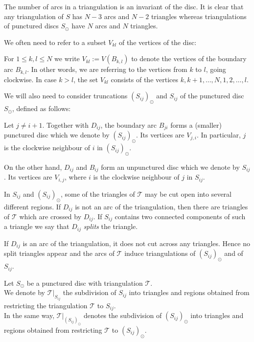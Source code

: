 \documentclass[a4paper]{amsart}
\begin{document}
The number of arcs in a triangulation is an invariant of the disc.
It is clear that any triangulation of $S$ has $N-3$ arcs and $N-2$
triangles
whereas triangulations of punctured discs $S_{\odot}$ have $N$ arcs
and $N$ triangles.

We often need to refer to a subset $V_{kl}$ of the vertices of the
disc:
\begin{definition}
For $1\le k,l\le N$ we write $V_{kl}:=V(B_{k,l})$
to denote the vertices of the
boundary arc $B_{k,l}$. In other words, we are referring to the
vertices
from $k$ to $l$, going clockwise. In case $k>l$, the set $V_{kl}$
consists of the
vertices $k,k+1,\dots,N,1,2,\dots,l$.
\end{definition}

We will also need to consider truncations
$(S_{ij})_{\odot}$ and $S_{ij}$ of the punctured disc
$S_{\odot}$, defined as follows:
\begin{definition}\label{def:truncation}
Let $j\neq i+1$.
Together with $D_{ij}$, the boundary arc
$B_{ji}$ forms a
(smaller) punctured disc which we denote by
$(S_{ij})_{\odot}$. Its vertices
are $V_{j,i}$. In particular, $j$ is the clockwise
neighbour of $i$ in $(S_{ij})_{\odot}$.

On the other hand, $D_{ij}$ and $B_{ij}$ form
an unpunctured disc which we denote by $S_{ij}$.
Its vertices are $V_{i,j}$, where $i$ is the
clockwise neighbour of $j$ in $S_{ij}$.
\end{definition}

In $S_{ij}$ and $(S_{ij})_{\odot}$,
some of the triangles of
${\mathcal T}$ may be cut open into several different regions.
If $D_{ij}$ is not an arc of the
triangulation, then there are triangles of ${\mathcal T}$
which are crossed by $D_{ij}$.
If $S_{ij}$ contains two connected components of
such a triangle we say that $D_{ij}$ {\em splits} the triangle.

\begin{remark}
If $D_{ij}$ is an arc of the triangulation, it does not cut across
any triangles. Hence no split triangles appear and the arcs
of ${\mathcal T}$ induce triangulations of $(S_{ij})_{\odot}$ and of $S_{ij}$.
\end{remark}

\begin{definition}
Let $S_{\odot}$ be a punctured disc with triangulation ${\mathcal T}$. \\
We denote by ${\mathcal T}|_{S_{ij}}$ the subdivision of $S_{ij}$ into
triangles and regions obtained from restricting the
triangulation ${\mathcal T}$ to $S_{ij}$. \\
In the same way, ${\mathcal T}|_{(S_{ij})_{\odot}}$ denotes the subdivision of
$(S_{ij})_{\odot}$ into triangles and regions obtained from
restricting ${\mathcal T}$ to $(S_{ij})_{\odot}$.
\end{definition}
\end{document}
